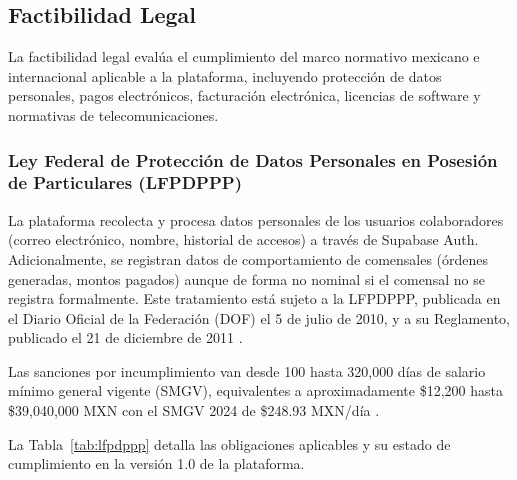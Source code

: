 \FloatBarrier
\subsection{Factibilidad Legal}

La factibilidad legal evalúa el cumplimiento del marco normativo mexicano e
internacional aplicable a la plataforma, incluyendo protección de datos personales,
pagos electrónicos, facturación electrónica, licencias de software y normativas
de telecomunicaciones.

\subsubsection{Ley Federal de Protección de Datos Personales en Posesión de
Particulares (LFPDPPP)}

La plataforma recolecta y procesa datos personales de los usuarios colaboradores
(correo electrónico, nombre, historial de accesos) a través de Supabase Auth.
Adicionalmente, se registran datos de comportamiento de comensales (órdenes
generadas, montos pagados) aunque de forma no nominal si el comensal no se
registra formalmente. Este tratamiento está sujeto a la LFPDPPP, publicada en
el Diario Oficial de la Federación (DOF) el 5 de julio de 2010, y a su Reglamento,
publicado el 21 de diciembre de 2011 \cite{covermanager_pricing, lfpdppp}.

Las sanciones por incumplimiento van desde 100 hasta 320,000 días de salario
mínimo general vigente (SMGV), equivalentes a aproximadamente \$12,200 hasta
\$39,040,000 MXN con el SMGV 2024 de \$248.93 MXN/día \cite{reglamento_lfpdppp}.

La Tabla~\ref{tab:lfpdppp} detalla las obligaciones aplicables y su estado de
cumplimiento en la versión 1.0 de la plataforma.

